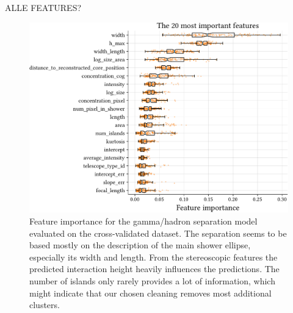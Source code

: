 ALLE FEATURES?
\begin{figure}
    \centering
    \captionsetup{width=0.9\linewidth}
    \hspace*{-0.15\textwidth}\includegraphics[page=1, width=.9\textwidth]{../analysis/plots/separation_features.pdf}
    \caption{Feature importance for the gamma/hadron separation model evaluated on the cross-validated dataset.
    The separation seems to be based mostly on the description of the main shower ellipse, especially its width and length.
    From the stereoscopic features the predicted interaction height heavily influences the predictions.
    The number of islands only rarely provides a lot of information, which might indicate that our chosen cleaning 
    removes most additional clusters.}
    \label{fig:gh_features}
\end{figure}
